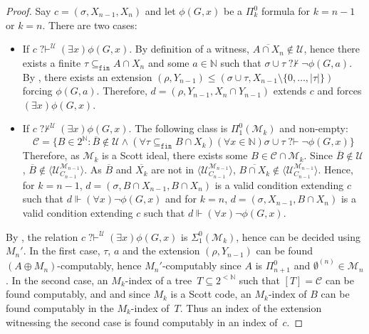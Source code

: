 \documentclass{article}
\def\NN{\mathbb{N}}
\def\U{\mathcal{U}}
\def\C{\mathcal{C}}
\def\M{\mathcal{M}}
\newcommand{\bstr}{2^{<\NN}}
\newcommand{\qvdash}{\operatorname{{?}{\vdash}}}
\newcommand{\nqvdash}{\operatorname{{?}{\nvdash}}}
\newcommand{\finsub}{\subseteq_{\mathtt{fin}}}
\numberwithin{theorem}{section}
\theoremstyle{definition}
\begin{document}
\begin{proof}
    Say $c = (\sigma,X_{n-1},X_{n})$ and let $\phi(G,x)$ be a $\Pi_k^0$ formula for $k = n -1$ or $k = n$. There are two cases:
    \begin{itemize}
        \item If $c \qvdash^\U (\exists x)\phi(G,x)$. By definition of a witness, $\overline{A \cap X_{n}} \notin \U$, hence there exists a finite $\tau \finsub A \cap X_{n}$ and some $a \in \NN$ such that $\sigma \cup \tau \nqvdash \neg \phi(G,a)$. By , there exists an extension $(\rho,Y_{n-1}) \leq (\sigma \cup \tau, X_{n-1} \setminus \{0, \dots, |\tau|\})$ forcing $\phi(G,a)$. Therefore, $d = (\rho, Y_{n-1}, X_{n} \cap Y_{n-1})$ extends $c$ and forces $(\exists x)\phi(G,x)$.
        
        \item  If $c \nqvdash^\U (\exists x)\phi(G,x)$. The following class is $\Pi_1^0(\M_k)$ and non-empty:
        $$\C = \{B \in 2^{\NN} : \overline{B} \notin \U \wedge (\forall \tau \finsub B \cap X_k)(\forall x \in \NN) \sigma \cup \tau \qvdash \neg \phi(G,x) \}$$
        Therefore, as $\M_k$ is a Scott ideal, there exists some $B \in \C \cap \M_k$. Since $\overline{B} \notin \U$, $\overline{B} \notin \langle \U_{C_{n-1}}^{\M_{n-1}} \rangle$. As $\overline{B}$ and $\overline{X_k}$ are not in $\langle \U_{C_{n-1}}^{\M_{n-1}} \rangle$, $\overline{B \cap X_k} \notin \langle \U_{C_{n-1}}^{\M_{n-1}} \rangle$. Hence, for $k = n-1$, $d = (\sigma, B \cap X_{n-1}, B \cap X_{n})$ is a valid condition extending $c$ such that $d \Vdash (\forall x)\neg \phi(G,x)$ and for $k = n$, $d = (\sigma, X_{n-1}, B \cap X_{n})$ is a valid condition extending $c$ such that $d \Vdash (\forall x)\neg \phi(G,x)$.
    \end{itemize}
By , the relation $c \qvdash^\U (\exists x)\phi(G,x)$ is $\Sigma^0_1(\M_k)$, hence can be decided using $M_n'$. In the first case,  $\tau$, $a$ and the extension $(\rho, Y_{n-1})$ can be found $(A \oplus M_n)$-computably, hence $M_n'$-computably since $A$ is $\Pi^0_{n+1}$ and $\emptyset^{(n)} \in \M_n$.
In the second case, an $M_k$-index of a tree~$T \subseteq \bstr$ such that $[T] = \C$ can be found computably, and and since $M_k$ is a Scott code, an $M_k$-index of $B$ can be found computably in the $M_k$-index of~$T$. Thus an index of the extension witnessing the second case is found computably in an index of~$c$.
\end{proof}
\end{document}
